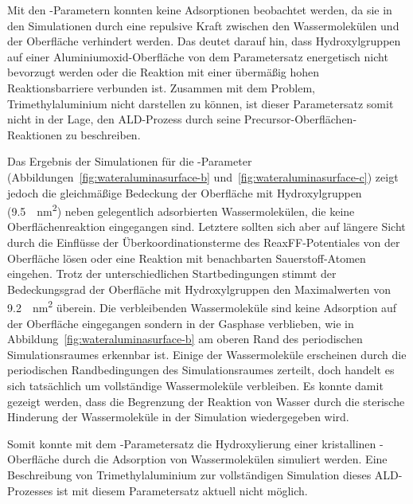 Mit den -Parametern konnten keine Adsorptionen beobachtet werden, da sie in den Simulationen durch eine repulsive Kraft zwischen den Wassermolekülen und der Oberfläche verhindert werden.
Das deutet darauf hin, dass Hydroxylgruppen auf einer Aluminiumoxid-Oberfläche von dem Parametersatz energetisch nicht bevorzugt werden oder die Reaktion mit einer übermäßig hohen Reaktionsbarriere verbunden ist.
Zusammen mit dem Problem, Trimethylaluminium nicht darstellen zu können, ist dieser Parametersatz somit nicht in der Lage, den ALD-Prozess durch seine Precursor-Oberflächen-Reaktionen zu beschreiben.

Das Ergebnis der Simulationen für die -Parameter (Abbildungen~\ref{fig:wateraluminasurface-b} und~\ref{fig:wateraluminasurface-c}) zeigt jedoch die gleichmäßige Bedeckung der Oberfläche mit Hydroxylgruppen (\SI{9.5}{\per\square\nano\meter}) neben gelegentlich adsorbierten Wassermolekülen, die keine Oberflächenreaktion eingegangen sind.
Letztere sollten sich aber auf längere Sicht durch die Einflüsse der Überkoordinationsterme des ReaxFF-Potentiales von der Oberfläche lösen oder eine Reaktion mit benachbarten Sauerstoff-Atomen eingehen.
Trotz der unterschiedlichen Startbedingungen stimmt der Bedeckungsgrad der Oberfläche mit Hydroxylgruppen den Maximalwerten von \SI{9.2}{\per\square\nano\meter}\cite{kim_energy_2011} überein.
Die verbleibenden Wassermoleküle sind keine Adsorption auf der Oberfläche eingegangen sondern in der Gasphase verblieben, wie in Abbildung~\ref{fig:wateraluminasurface-b} am oberen Rand des periodischen Simulationsraumes erkennbar ist.
Einige der Wassermoleküle erscheinen durch die periodischen Randbedingungen des Simulationsraumes zerteilt, doch handelt es sich tatsächlich um vollständige Wassermoleküle verbleiben.
Es konnte damit gezeigt werden, dass die Begrenzung der Reaktion von Wasser durch die sterische Hinderung der Wassermoleküle in der Simulation wiedergegeben wird.

Somit konnte mit dem -Parametersatz die Hydroxylierung einer kristallinen -Ober\-fläche durch die Adsorption von Wassermolekülen simuliert werden.
Eine Beschreibung von Trimethylaluminium zur vollständigen Simulation dieses ALD-Prozesses ist mit diesem Parametersatz aktuell nicht möglich.
